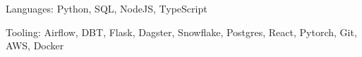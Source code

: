


\begin{cvskills}


\cvskill
{Languages:} %
{Python, SQL, NodeJS, TypeScript} %


\cvskill
{Tooling:} %
{Airflow, DBT, Flask, Dagster, Snowflake, Postgres, React, Pytorch, Git, AWS, Docker}


\end{cvskills}